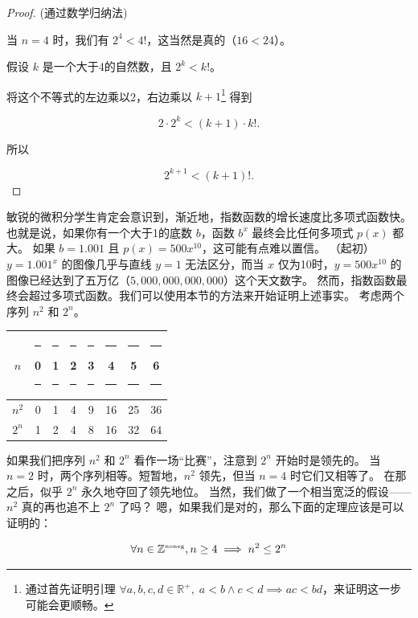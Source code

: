 \begin{proof}
(通过数学归纳法)

当 $n=4$ 时，我们有 $2^4 < 4!$，这当然是真的（$16 < 24$）。

假设 $k$ 是一个大于4的自然数，且 $2^k < k!$。

将这个不等式的左边乘以2，右边乘以 $k+1$\footnote{通过首先证明引理 $\forall a,b,c,d \in {\mathbb R}^+, \; a<b \land c<d \implies ac < bd$，来证明这一步可能会更顺畅。} 得到

\[ 2\cdot 2^{k} < (k+1) \cdot k!.
\]

\noindent 所以

\[ 2^{k+1} < (k+1)!. \]

\end{proof}

敏锐的微积分学生肯定会意识到，渐近地，指数函数的增长速度比多项式函数快。
也就是说，如果你有一个大于1的底数 $b$，函数 $b^x$ 最终会比任何多项式 $p(x)$ 都大。
如果 $b=1.001$ 且 $p(x) = 500x^{10}$，这可能有点难以置信。
（起初）$y=1.001^x$ 的图像几乎与直线 $y=1$ 无法区分，而当 $x$ 仅为10时，$y=500x^{10}$ 的图像已经达到了五万亿（$5,000,000,000,000$）这个天文数字。
然而，指数函数最终会超过多项式函数。我们可以使用本节的方法来开始证明上述事实。
考虑两个序列 $n^2$ 和 $2^n$。

\begin{center}
\begin{tabular}{c|ccccccc}
$n$   & \rule{6pt}{0pt} 0 \rule{6pt}{0pt} & \rule{6pt}{0pt} 1 \rule{6pt}{0pt} & \rule{6pt}{0pt} 2 \rule{6pt}{0pt} & \rule{6pt}{0pt} 3 \rule{6pt}{0pt} & \rule{6pt}{0pt} 4 \rule{6pt}{0pt} & \rule{6pt}{0pt} 5 \rule{6pt}{0pt} & \rule{6pt}{0pt} 6 \rule{6pt}{0pt} \\ \hline
$n^2$  & 0 & 1 & 4 & 9 & 16 & 25 & 36 \\ \hline
$2^n$ & 1 & 2 & 4 & 8 & 16 & 32 & 64 \\ 
\end{tabular}
\end{center}

如果我们把序列 $n^2$ 和 $2^n$ 看作一场“比赛”，注意到 $2^n$ 开始时是领先的。
当 $n=2$ 时，两个序列相等。短暂地，$n^2$ 领先，但当 $n=4$ 时它们又相等了。
在那之后，似乎 $2^n$ 永久地夺回了领先地位。
当然，我们做了一个相当宽泛的假设——$n^2$ 真的再也追不上 $2^n$ 了吗？
嗯，如果我们是对的，那么下面的定理应该是可以证明的：

\begin{thm} 
\[ \forall n \in {\mathbb Z}^{\mbox{\tiny noneg}}, n \geq 4 \implies n^2 \leq 2^n \]
\end{thm}
 
